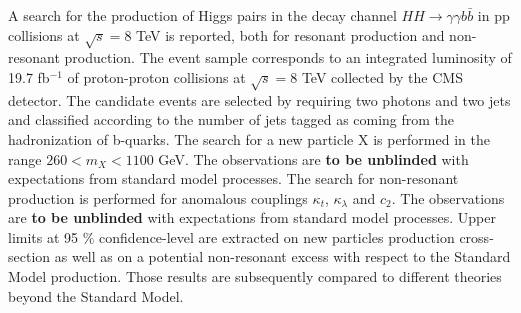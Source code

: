 A search for the production of Higgs pairs in the decay channel
$HH \rightarrow \gamma\gamma b\bar{b}$ in pp collisions at $\sqrt{s}=8$ TeV is reported, both for
resonant production and non-resonant production. The event sample corresponds to an integrated
luminosity of 19.7 fb$^{-1}$ of proton-proton collisions at $\sqrt{s}=8$ TeV collected by the
CMS detector. The candidate events are selected by requiring two photons and two jets and classified
according to the number of jets tagged as coming from the hadronization of b-quarks.
The search for a new particle X is performed in the range $260 < m_X < 1100$ GeV. The observations
are {\bf to be unblinded} with expectations from standard model processes.
The search for non-resonant production is performed for anomalous couplings
$\kappa_{t}$, $\kappa_{\lambda}$ and $c_2$.
The observations are {\bf to be unblinded} with expectations from standard model processes.
Upper limits at 95 $\%$ confidence-level are extracted on new particles production cross-section
as well as on a potential non-resonant excess with respect to the Standard Model production.
Those results are subsequently compared to different theories beyond the Standard Model.
